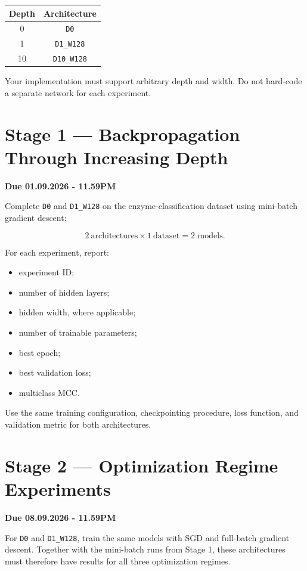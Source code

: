\documentclass[11pt,a4paper]{article}
\newcommand{\code}[1]{\texttt{#1}}
\begin{document}
\begin{center}
\begin{tabular}{cc}
\toprule
\textbf{Depth} & \textbf{Architecture} \\
\midrule
0 & \code{D0} \\
1 & \code{D1\_W128} \\
10 & \code{D10\_W128} \\
\bottomrule
\end{tabular}
\end{center}

Your implementation must support arbitrary depth and width. Do not hard-code a separate network for each experiment.

\section{Stage 1 --- Backpropagation Through Increasing Depth}

\textbf{Due 01.09.2026 - 11.59PM}

Complete \code{D0} and \code{D1\_W128} on the enzyme-classification dataset using mini-batch gradient descent:

\[
2\ \text{architectures}\times1\ \text{dataset}
=\boxed{2\text{ models}}.
\]

For each experiment, report:

\begin{itemize}
    \item experiment ID;
    \item number of hidden layers;
    \item hidden width, where applicable;
    \item number of trainable parameters;
    \item best epoch;
    \item best validation loss;
    \item multiclass MCC.
\end{itemize}

Use the same training configuration, checkpointing procedure, loss function, and validation metric for both architectures.

\section{Stage 2 --- Optimization Regime Experiments}

\textbf{Due 08.09.2026 - 11.59PM}

For \code{D0} and \code{D1\_W128}, train the same models with SGD and full-batch gradient descent. Together with the mini-batch runs from Stage 1, these architectures must therefore have results for all three optimization regimes.
\end{document}
